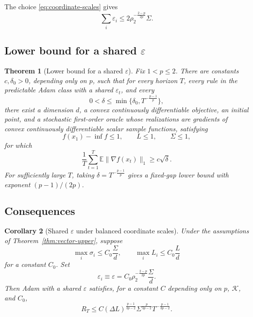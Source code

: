 \documentclass[11pt,letterpaper]{article}
\newtheorem{theorem}{Theorem}[section]
\newtheorem{corollary}[theorem]{Corollary}
\theoremstyle{definition}
\newcommand{\E}{\mathbb E}
\newcommand{\eps}{\varepsilon}
\newcommand{\grad}{\nabla}
\begin{document}
The choice \eqref{eq:coordinate-scales} gives
\begin{equation}
\sum_i\eps_i\le2\rho_2^{-\frac{2-p}{2p}}\Sigma.
\label{eq:floor-mass}
\end{equation}

\subsection{Lower bound for a shared \texorpdfstring{$\eps$}{epsilon}}

\begin{theorem}[Lower bound for a shared $\eps$]
\label{thm:scalar-impossibility}
Fix $1<p\le2$. There are constants $c,\delta_0>0$, depending only on $p$, such that for every horizon $T$, every rule in the predictable Adam class with a shared $\eps_t$, and every
\[
0<\delta\le\min\{\delta_0,T^{-\frac{p-1}{p}}\},
\]
there exist a dimension $d$, a convex continuously differentiable objective, an initial point, and a stochastic first-order oracle whose realizations are gradients of convex continuously differentiable scalar sample functions, satisfying
\[
f(x_1)-\inf f\le1,
\qquad
L\le1,
\qquad
\Sigma\le1,
\]
for which
\begin{equation}
\frac1T\sum_{t=1}^T\E\|\grad f(x_t)\|_1
\ge c\sqrt\delta.
\label{eq:shared-lb}
\end{equation}
For sufficiently large $T$, taking $\delta=T^{-\frac{p-1}{p}}$ gives a fixed-gap lower bound with exponent $(p-1)/(2p)$.
\end{theorem}

\subsection{Consequences}

\begin{corollary}[Shared $\eps$ under balanced coordinate scales]
\label{thm:balanced}
Under the assumptions of Theorem~\ref{thm:vector-upper}, suppose
\begin{equation}
\max_i\sigma_i\le C_0\frac{\Sigma}{d},
\qquad
\max_iL_i\le C_0\frac{L}{d}
\label{eq:balance}
\end{equation}
for a constant $C_0$. Set
\[
\eps_i\equiv\eps
=C_0\rho_2^{-\frac{2-p}{2p}}\frac{\Sigma}{d}.
\]
Then Adam with a shared $\eps$ satisfies, for a constant $C$ depending only on
$p$, $\mathcal K$, and $C_0$,
\[
R_T\le C
(\Delta L)^{\frac{p-1}{3p-2}}
\Sigma^{\frac{p}{3p-2}}T^{-\frac{p-1}{3p-2}}.
\]
\end{corollary}
\end{document}
